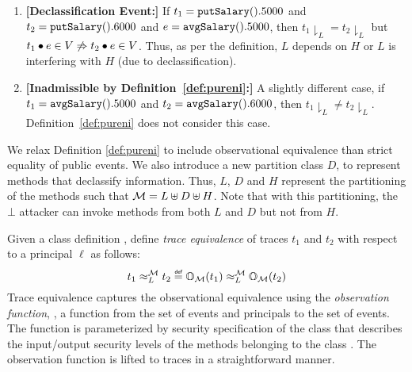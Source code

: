 \documentclass[acmsmall,screen,review, nonacm]{acmart}
\begin{document}
\begin{enumerate}


\item \textbf{[Declassification Event:]}
If $t_1 = \texttt{putSalary}().5000$ and  $t_2 = \texttt{putSalary}().6000$ and $e = \texttt{avgSalary}().5000$, then $t_1\downharpoonright_L = t_2\downharpoonright_L$ but  $t_1 \bullet e \in V \not \Rightarrow t_2 \bullet e \in V$. Thus, as per the definition, $L$ depends on $H$ or $L$ is interfering with $H$ (due to declassification).

\item \textbf{[Inadmissible by Definition~\ref{def:pureni}:]}
A slightly different case,  if $t_1 = \texttt{avgSalary}().5000$ and  $t_2 = \texttt{avgSalary}().6000$, then $t_1\downharpoonright_L \ne t_2\downharpoonright_L$. Definition~\ref{def:pureni} does not consider this case.

\end{enumerate}

We relax Definition \ref{def:pureni} to include observational equivalence  than strict equality of public events.
We also introduce a new partition class $D$, to represent methods that declassify information. Thus, $L$, $D$ and $H$ represent the partitioning of the methods such that $\mathcal{M} = L \uplus D \uplus H$.
Note that with this partitioning, the $\bot$ attacker can invoke methods from both $L$ and $D$ but not from $H$.

Given a class definition \classpart, define \emph{trace equivalence} of traces $t_1$ and $t_2$ with respect to a principal $\ell$ as follows:
\[
\treq{t_1}{t_2}{L}{\classpart} \isdef \ob{t_1}{\classpart}{\ell} \obsim{L}{\classpart} \ob{t_2}{\classpart}{\ell}
\]
Trace equivalence captures the  observational equivalence using the \emph{observation function}, , a function from the set of events and  principals to the set of events.
The function is parameterized by security specification of the class that describes the input/output security levels of the methods belonging to the class \classpart.
The observation function is lifted to traces in a straightforward manner.
\end{document}
